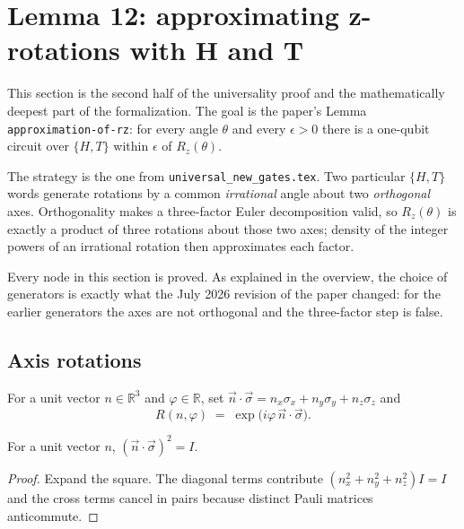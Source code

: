 \section{Lemma 12: approximating z-rotations with H and T}
\label{sec:lemma12}

This section is the second half of the universality proof and the
mathematically deepest part of the formalization.  The goal is the paper's
Lemma \texttt{approximation-of-rz}: for every angle $\theta$ and every
$\epsilon > 0$ there is a one-qubit circuit over $\{H,T\}$ within $\epsilon$ of
$R_z(\theta)$.

The strategy is the one from \texttt{universal\_new\_gates.tex}.  Two
particular $\{H,T\}$ words generate rotations by a common \emph{irrational}
angle about two \emph{orthogonal} axes.  Orthogonality makes a three-factor
Euler decomposition valid, so $R_z(\theta)$ is exactly a product of three
rotations about those two axes; density of the integer powers of an irrational
rotation then approximates each factor.

Every node in this section is proved.  As explained in the overview, the
choice of generators is exactly what the July 2026 revision of the paper
changed: for the earlier generators the axes are not orthogonal and the
three-factor step is false.

\subsection{Axis rotations}

\begin{definition}
  \label{def:axis_rotation}
  \leanok
  For a unit vector $n \in \mathbb{R}^3$ and $\varphi \in \mathbb{R}$, set
  $\vec{n}\cdot\vec{\sigma} = n_x\sigma_x + n_y\sigma_y + n_z\sigma_z$ and
  \[
    R(n,\varphi) \;=\; \exp\!\big(i\varphi\, \vec{n}\cdot\vec{\sigma}\big).
  \]
\end{definition}

\begin{lemma}
  \label{lem:pauli_sq}
  \leanok
  For a unit vector $n$, $(\vec{n}\cdot\vec{\sigma})^2 = I$.
\end{lemma}

\begin{proof}
  \leanok
  Expand the square.  The diagonal terms contribute
  $(n_x^2+n_y^2+n_z^2)I = I$ and the cross terms cancel in pairs because
  distinct Pauli matrices anticommute.
\end{proof}

